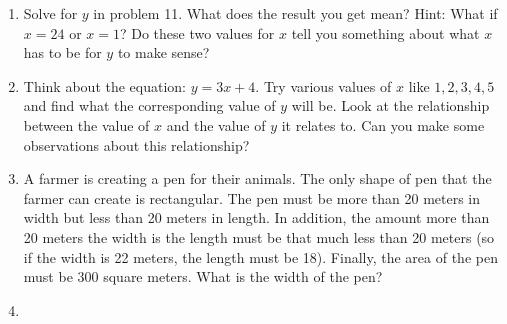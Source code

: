 \documentclass{article}
\begin{document}
\begin{multicols*}{2}
\begin{enumerate}
        \item Solve for $y$ in problem 11. What does the result you get mean? Hint: What if $x=24$ or $x=1$? Do these two values for $x$ tell you something about what $x$ has to be for $y$ to make sense? 
        \item Think about the equation: $y = 3x + 4$. Try various values of $x$ like $1, 2, 3, 4, 5$ and find what the corresponding value of $y$ will be. Look at the relationship between the value of $x$ and the value of $y$ it relates to. Can you make some observations about this relationship?
        \item A farmer is creating a pen for their animals. The only shape of pen that the farmer can create is rectangular. The pen must be more than 20 meters in width but less than 20 meters in length. In addition, the amount more than 20 meters the width is the length must be that much less than 20 meters (so if the width is 22 meters, the length must be 18). Finally, the area of the pen must be 300 square meters. What is the width of the pen? 
        \item 
    \end{enumerate}
\end{multicols*}
\end{document}

